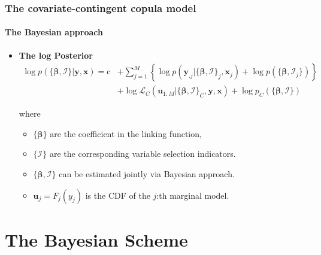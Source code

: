 \documentclass[10pt]{beamer}
\begin{document}
\begin{frame}[allowframebreaks]
  \frametitle{The covariate-contingent copula model}
  \framesubtitle{The Bayesian approach}
  \begin{itemize}

  \item \textbf{The log Posterior}
    \[
    \begin{split}\log p(\{\bm{\beta},\bm{\mathcal{I}}\}|\bm{y},\bm{x})=
      \mathrm{c}&+\sum\nolimits _{j=1}^{M}\left\{\log
        p(\bm{y}_{.j}|\{\bm{\beta},\bm{\mathcal{I}}\}_{j},\bm{x}_{j}) + \log p(\{\bm{\beta},\bm{\mathcal{I}}_j\}) \right\}\\
      & +\log\mathcal{L}_{C}(\bm{u}_{1:M}|\{\bm{\beta},\bm{\mathcal{I}}\}_{C},\bm{y},\bm{x})+
      \log p_C(\{\bm{\beta},\bm{\mathcal{I}}\})
    \end{split}
    \]

    where
    \begin{itemize}
    \item $\{\bm{\beta}\}$ are the coefficient in the linking function,
    \item $\{\bm{\mathcal{I}}\}$ are the corresponding variable selection indicators.
    \item $\{\bm{\beta},\bm{\mathcal{I}}\}$ can be estimated jointly via Bayesian approach.
    \item $\bm{u}_{j}=F_{j}(y_{j})$ is the CDF of the $j$:th marginal model.
    \end{itemize}


  \end{itemize}
\end{frame}

\section{The Bayesian Scheme}
\end{document}
